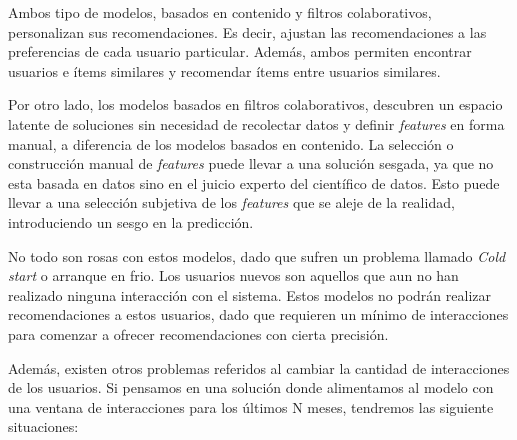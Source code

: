 \documentclass[11pt,a4paper,twoside]{thesis}
\begin{document}
Ambos tipo de modelos, basados en contenido y filtros colaborativos,
personalizan sus recomendaciones. Es decir, ajustan las recomendaciones a las
preferencias de cada usuario particular. Además, ambos permiten encontrar
usuarios e ítems similares y recomendar ítems entre usuarios similares.

Por otro lado, los modelos basados en filtros colaborativos, descubren un
espacio latente de soluciones sin necesidad de recolectar datos y definir
\textit{features} en forma manual, a diferencia de los modelos basados en
contenido. La selección o construcción manual de \textit{features} puede llevar
a una solución sesgada, ya que no esta basada en datos sino en el juicio
experto del científico de datos. Esto puede llevar a una selección subjetiva de
los \textit{features} que se aleje de la realidad, introduciendo un sesgo en la
predicción.

No todo son rosas con estos modelos, dado que sufren un problema llamado
\textit{Cold start} o arranque en frio. Los usuarios nuevos son aquellos que
aun no han realizado ninguna interacción con el sistema. Estos modelos no
podrán realizar recomendaciones a estos usuarios, dado que requieren un mínimo
de interacciones para comenzar a ofrecer recomendaciones con cierta precisión.

Además, existen otros problemas referidos al cambiar la cantidad de
interacciones de los usuarios. Si pensamos en una solución donde alimentamos al
modelo con una ventana de interacciones para los últimos N meses, tendremos las
siguiente situaciones:
\end{document}
